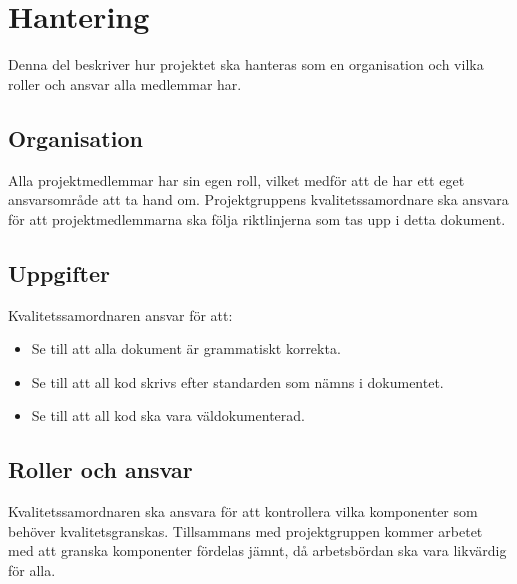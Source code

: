 \section{Hantering}
Denna del beskriver hur projektet ska hanteras som en organisation och vilka roller och ansvar alla medlemmar har. 

\subsection{Organisation}
Alla projektmedlemmar har sin egen roll, vilket medför att de har ett eget ansvarsområde att ta hand om. Projektgruppens kvalitetssamordnare ska ansvara för att projektmedlemmarna ska följa riktlinjerna som tas upp i detta dokument.

\subsection{Uppgifter}
Kvalitetssamordnaren ansvar för att:
\begin{itemize}
\item Se till att alla dokument är grammatiskt korrekta. 
\item Se till att all kod skrivs efter standarden som nämns i dokumentet.
\item Se till att all kod ska vara väldokumenterad.
\end{itemize}

\subsection{Roller och ansvar}
Kvalitetssamordnaren ska ansvara för att kontrollera vilka komponenter som behöver kvalitetsgranskas. Tillsammans med projektgruppen kommer arbetet med att granska komponenter fördelas jämnt, då arbetsbördan ska vara likvärdig för alla.




